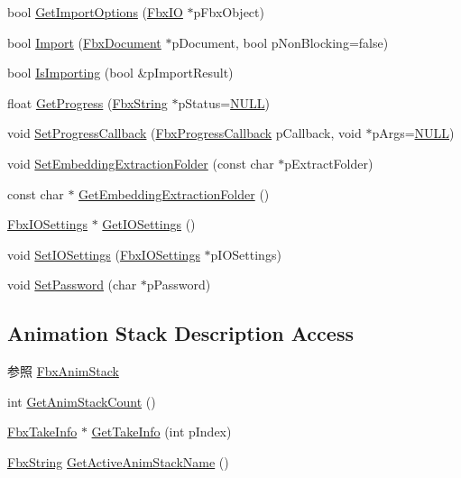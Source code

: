 \begin{DoxyCompactItemize}
bool \hyperlink{class_fbx_importer_ab9cedea15a7015b3298e1d28f11d7108}{Get\+Import\+Options} (\hyperlink{class_fbx_i_o}{Fbx\+IO} $\ast$p\+Fbx\+Object)
\item 
bool \hyperlink{class_fbx_importer_a1c5a7f9ee8a6952c1e039065cfa09659}{Import} (\hyperlink{class_fbx_document}{Fbx\+Document} $\ast$p\+Document, bool p\+Non\+Blocking=false)
\item 
bool \hyperlink{class_fbx_importer_a8146a9982be07e4e287eb17b1c291c0b}{Is\+Importing} (bool \&p\+Import\+Result)
\item 
float \hyperlink{class_fbx_importer_a7b464230d0665b43e6a0617efd75f068}{Get\+Progress} (\hyperlink{class_fbx_string}{Fbx\+String} $\ast$p\+Status=\hyperlink{fbxarch_8h_a070d2ce7b6bb7e5c05602aa8c308d0c4}{N\+U\+LL})
\item 
void \hyperlink{class_fbx_importer_adcb26ff112db465208caefc5c5d8a6e1}{Set\+Progress\+Callback} (\hyperlink{fbxprogress_8h_a3765040904b462fb1f2673caba3488db}{Fbx\+Progress\+Callback} p\+Callback, void $\ast$p\+Args=\hyperlink{fbxarch_8h_a070d2ce7b6bb7e5c05602aa8c308d0c4}{N\+U\+LL})
\item 
void \hyperlink{class_fbx_importer_a3ba4bf6e00487b45808fa5fe052063f0}{Set\+Embedding\+Extraction\+Folder} (const char $\ast$p\+Extract\+Folder)
\item 
const char $\ast$ \hyperlink{class_fbx_importer_a5f546e059c21d9e6b67cb546d4e4ac03}{Get\+Embedding\+Extraction\+Folder} ()
\item 
\hyperlink{class_fbx_i_o_settings}{Fbx\+I\+O\+Settings} $\ast$ \hyperlink{class_fbx_importer_a864398459eef6683640812b9b82f92c9}{Get\+I\+O\+Settings} ()
\item 
void \hyperlink{class_fbx_importer_a7d601352ed7e7bd9b7f05740573ef09d}{Set\+I\+O\+Settings} (\hyperlink{class_fbx_i_o_settings}{Fbx\+I\+O\+Settings} $\ast$p\+I\+O\+Settings)
\item 
void \hyperlink{class_fbx_importer_a4e3bba6f851555a94ba1eef1030b6503}{Set\+Password} (char $\ast$p\+Password)
\end{DoxyCompactItemize}
\subsection*{Animation Stack Description Access}
\label{_amgrpc1e0fcdffc2fc2ebf3b87f03d548bbc0}%
\begin{DoxySeeAlso}{参照}
\hyperlink{class_fbx_anim_stack}{Fbx\+Anim\+Stack} 
\end{DoxySeeAlso}
\begin{DoxyCompactItemize}
\item 
int \hyperlink{class_fbx_importer_a08165aec1a0ae0ff5f88c5ee8244bd9d}{Get\+Anim\+Stack\+Count} ()
\item 
\hyperlink{class_fbx_take_info}{Fbx\+Take\+Info} $\ast$ \hyperlink{class_fbx_importer_a6733de02d09423cfc5cdabd808954e62}{Get\+Take\+Info} (int p\+Index)
\item 
\hyperlink{class_fbx_string}{Fbx\+String} \hyperlink{class_fbx_importer_a7d0e41971469f7fb42fdd0af77a98c2a}{Get\+Active\+Anim\+Stack\+Name} ()
\end{DoxyCompactItemize}
